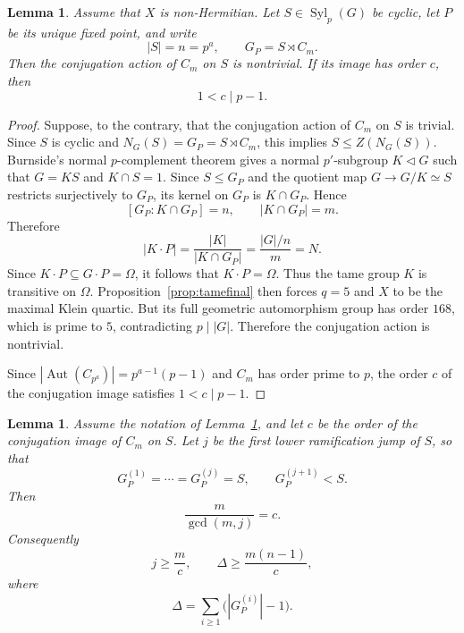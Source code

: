 \documentclass[11pt]{amsart}
\newtheorem{lemma}[theorem]{Lemma}
\theoremstyle{remark}
\newcommand{\Aut}{\operatorname{Aut}}
\newcommand{\Syl}{\operatorname{Syl}}
\begin{document}
\begin{lemma}\label{lem:noncentral}
Assume that $X$ is non-Hermitian.  Let $S\in\Syl_p(G)$ be cyclic, let
$P$ be its unique fixed point, and write
\[
          |S|=n=p^a,\qquad
          G_P=S\rtimes C_m.
\]
Then the conjugation action of $C_m$ on $S$ is nontrivial.  If its image
has order $c$, then
\[
          1<c\mid p-1.
\]
\end{lemma}

\begin{proof}
Suppose, to the contrary, that the conjugation action of $C_m$ on $S$
is trivial.  Since $S$ is cyclic and $N_G(S)=G_P=S\rtimes C_m$, this
implies $S\le Z(N_G(S))$.  Burnside's normal $p$-complement theorem
\cite[Theorem~5.13]{Isaacs} gives a normal $p'$-subgroup $K\triangleleft G$ such that
$G=KS$ and $K\cap S=1$.  Since $S\le G_P$ and the quotient map
$G\to G/K\simeq S$ restricts surjectively to $G_P$, its kernel on $G_P$
is $K\cap G_P$.  Hence
\[
          [G_P:K\cap G_P]=n,
          \qquad |K\cap G_P|=m.
\]
Therefore
\[
          |K\cdot P|
          =\frac{|K|}{|K\cap G_P|}
          =\frac{|G|/n}{m}
          =N.
\]
Since $K\cdot P\subseteq G\cdot P=\Omega$, it follows that
$K\cdot P=\Omega$.  Thus the tame group $K$ is transitive on $\Omega$.
Proposition~\ref{prop:tamefinal} then forces $q=5$ and $X$ to be the
maximal Klein quartic.  But its full geometric automorphism group has
order $168$, which is prime to $5$, contradicting $p\mid|G|$.
Therefore the conjugation action is nontrivial.

Since $|\Aut(C_{p^a})|=p^{a-1}(p-1)$ and $C_m$ has order prime
to $p$, the order $c$ of the conjugation image satisfies
$1<c\mid p-1$.
\end{proof}

\begin{lemma}\label{lem:local}
Assume the notation of Lemma~\ref{lem:noncentral}, and let $c$ be the
order of the conjugation image of $C_m$ on $S$.  Let $j$ be the first
lower ramification jump of $S$, so that
\[
 G_P^{(1)}=\cdots=G_P^{(j)}=S,
 \qquad
 G_P^{(j+1)}<S.
\]
Then
\begin{equation}\label{eq:localrelation}
          \frac{m}{\gcd(m,j)}=c.
\end{equation}
Consequently
\begin{equation}\label{eq:Delta-lower}
          j\ge\frac{m}{c},
          \qquad
          \Delta\ge\frac{m(n-1)}{c},
\end{equation}
where
\[
          \Delta=\sum_{i\ge1}\bigl(|G_P^{(i)}|-1\bigr).
\]
\end{lemma}
\end{document}
